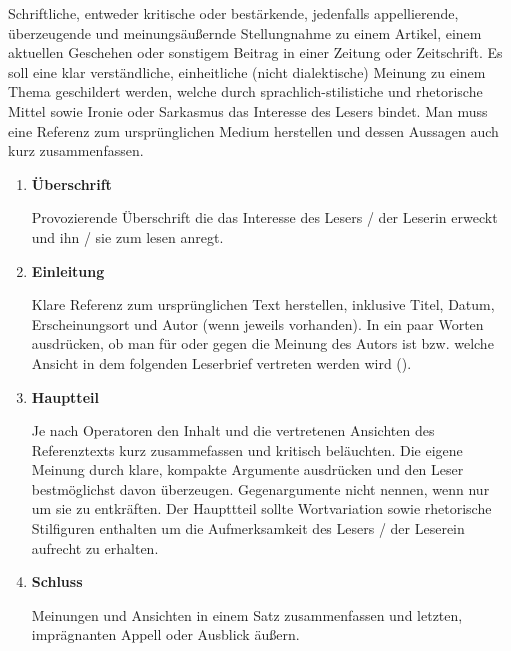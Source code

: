 







Schriftliche, entweder kritische oder best\"{a}rkende, jedenfalls appellierende, \"{u}berzeugende und meinungs\"{a}u\ss{}ernde Stellungnahme zu einem Artikel, einem aktuellen Geschehen oder sonstigem Beitrag in einer Zeitung oder Zeitschrift. Es soll eine klar verst\"{a}ndliche, einheitliche (nicht dialektische) Meinung zu einem Thema geschildert werden, welche durch sprachlich-stilistiche und rhetorische Mittel sowie Ironie oder Sarkasmus das Interesse des Lesers bindet. Man muss eine Referenz zum urspr\"{u}nglichen Medium herstellen und dessen Aussagen auch kurz zusammenfassen.


\begin{enumerate}
  \item \textbf{\"{U}berschrift}
  \par
        Provozierende \"{U}berschrift die das Interesse des Lesers / der Leserin erweckt und ihn / sie zum lesen anregt.

  \item \textbf{Einleitung}
  \par
  Klare Referenz zum urspr\"{u}nglichen Text herstellen, inklusive Titel, Datum, Erscheinungsort und Autor (wenn jeweils vorhanden). In ein paar Worten ausdr\"{u}cken, ob man f\"{u}r oder gegen die Meinung des Autors ist bzw. welche Ansicht in dem folgenden Leserbrief vertreten werden wird ().

  \item \textbf{Hauptteil}
  \par
  Je nach Operatoren den Inhalt und die vertretenen Ansichten des Referenztexts kurz zusammefassen und kritisch bel\"{a}uchten. Die eigene Meinung durch klare, kompakte Argumente ausdr\"{u}cken und den Leser bestm\"{o}glichst davon \"{u}berzeugen. Gegenargumente nicht nennen, wenn nur um sie zu entkr\"{a}ften. Der Haupttteil sollte Wortvariation sowie rhetorische Stilfiguren enthalten um die Aufmerksamkeit des Lesers / der Leserein aufrecht zu erhalten.

  \item \textbf{Schluss}
  \par
  Meinungen und Ansichten in einem Satz zusammenfassen und letzten, impr\"{a}gnanten Appell oder Ausblick \"{a}u\ss{}ern.

\end{enumerate}

